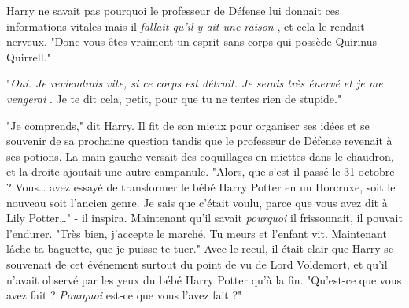 Harry ne savait pas pourquoi le professeur de Défense lui donnait ces informations vitales mais il \emph{fallait qu'il y ait une raison} , et cela le rendait nerveux. "Donc vous êtes vraiment un esprit sans corps qui possède Quirinus Quirrell."

"\emph{Oui. Je reviendrais vite, si ce corps est détruit. Je serais très énervé et je me vengerai} . Je te dit cela, petit, pour que tu ne tentes rien de stupide."

"Je comprends," dit Harry. Il fit de son mieux pour organiser ses idées et se souvenir de sa prochaine question tandis que le professeur de Défense revenait à ses potions. La main gauche versait des coquillages en miettes dans le chaudron, et la droite ajoutait une autre campanule. "Alors, que s'est-il passé le 31 octobre ? Vous… avez essayé de transformer le bébé Harry Potter en un Horcruxe, soit le nouveau soit l'ancien genre. Je sais que c'était voulu, parce que vous avez dit à Lily Potter…" - il inspira. Maintenant qu'il savait \emph{pourquoi}  il frissonnait, il pouvait l'endurer. "Très bien, j'accepte le marché. Tu meurs et l'enfant vit. Maintenant lâche ta baguette, que je puisse te tuer." Avec le recul, il était clair que Harry se souvenait de cet événement surtout du point de vu de Lord Voldemort, et qu'il n'avait observé par les yeux du bébé Harry Potter qu'à la fin. "Qu'est-ce que vous avez fait ? \emph{Pourquoi}  est-ce que vous l'avez fait ?"

